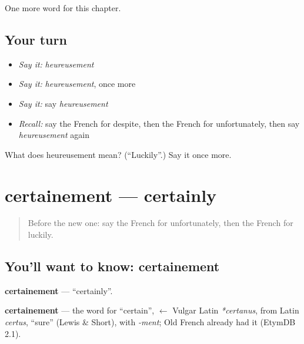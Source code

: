 \begin{grammarlens}[title={What you've built}]
One more word for this chapter.
\end{grammarlens}

\subsection*{Your turn}
\begin{itemize}
\raggedright
  \item \emph{Say it:} \emph{heureusement}
  \item \emph{Say it:} \emph{heureusement}, once more
  \item \emph{Say it:} say \emph{heureusement}
  \item \emph{Recall:} say the French for despite, then the French for unfortunately, then say \emph{heureusement} again
\end{itemize}

\begin{tcolorbox}[breakable,colback=teal!4,colframe=teal!35!black,title={Before you move on}]
What does heureusement mean? (\textquotedblleft{}Luckily\textquotedblright{}.) Say it once more.
\end{tcolorbox}
\section[certainement]{certainement — certainly}

\label{lesson:FR-C189-certainement}



\begin{quote}
Before the new one: say the French for unfortunately, then the French for luckily.
\end{quote}

\subsection*{You'll want to know: certainement}
\textbf{certainement} — \textquotedblleft{}certainly\textquotedblright{}.

\begin{cousinweb}
\textbf{certainement} — the word for \textquotedblleft{}certain\textquotedblright{}, $\leftarrow$ Vulgar Latin \emph{*certanus}, from Latin \emph{certus}, \textquotedblleft{}sure\textquotedblright{} (Lewis \& Short), with \emph{-ment}; Old French already had it (EtymDB 2.1).
\end{cousinweb}

